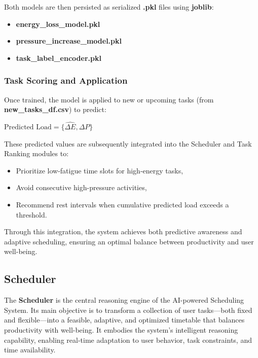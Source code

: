 \documentclass[12pt, a4paper]{article}
\begin{document}
            Both models are then persisted as serialized \textbf{.pkl} files using \textbf{joblib}: 
            
            \begin{itemize}
                \item \textbf{energy\_loss\_model.pkl}
                \item \textbf{pressure\_increase\_model.pkl}
                \item \textbf{task\_label\_encoder.pkl}
            \end{itemize}
    
        \subsubsection{Task Scoring and Application}
    
            Once trained, the model is applied to new or upcoming tasks (from \textbf{new\_tasks\_df.csv}) to predict:
    
            \begin{center}
                $\text{Predicted Load} = \{\widehat{\Delta E}, \widehat{\Delta P}\}$
            \end{center}
    
            These predicted values are subsequently integrated into the Scheduler and Task Ranking modules to:
    
            \begin{itemize}
                \item Prioritize low-fatigue time slots for high-energy tasks,
                \item Avoid consecutive high-pressure activities,
                \item Recommend rest intervals when cumulative predicted load exceeds a threshold.
            \end{itemize}
    
            Through this integration, the system achieves both predictive awareness and adaptive scheduling, ensuring an optimal balance between productivity and user well-being.
    
    \subsection{Scheduler}
    
        The \textbf{Scheduler} is the central reasoning engine of the AI-powered Scheduling System. Its main objective is to transform a collection of user tasks—both fixed and flexible—into a feasible, adaptive, and optimized timetable that balances productivity with well-being. It embodies the system’s intelligent reasoning capability, enabling real-time adaptation to user behavior, task constraints, and time availability. 
        
\end{document}
